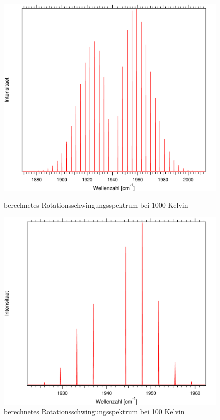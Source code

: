 \begin{figure}[H]
	
	\begin{minipage}{0.5\textwidth}
	\includegraphics[width=\textwidth]{Bilder/100CO.pdf}
	\caption{berechnetes Rotationsschwingungsspektrum bei 1000 Kelvin}
	\end{minipage}
\begin{minipage}{0.5\textwidth}
	\includegraphics[width=\textwidth]{Bilder/10CO.pdf}
	\caption{berechnetes Rotationsschwingungsspektrum bei 100 Kelvin}
	\end{minipage}	
	
		
	\label{Rot:10CO}
\end{figure}

